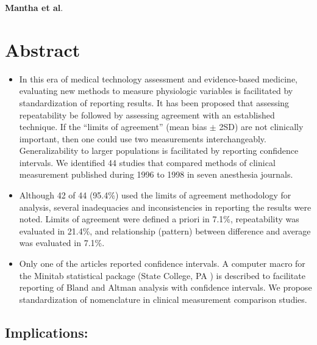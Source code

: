 \documentclass[]{article}
\title{}
\author{}
\begin{document}
{
	
\Large \textbf{Mantha et al}.

}	
	\section{Abstract}
	\begin{itemize}
		\item In this era of medical technology assessment and evidence-based medicine, evaluating new methods to measure physiologic variables is facilitated by standardization of reporting results. It has been proposed that assessing repeatability be followed by assessing agreement with an established technique. If the “limits of agreement” (mean bias $\pm$ 2SD) are not clinically important, then one could use two measurements interchangeably. Generalizability to larger populations is facilitated by reporting confidence intervals. We identified 44 studies that compared methods of clinical measurement published during 1996 to 1998 in seven anesthesia journals. 
		
		\item Although 42 of 44 (95.4\%) used the limits of agreement methodology for analysis, several inadequacies and inconsistencies in reporting the results were noted. Limits of agreement were defined a priori in 7.1\%, repeatability was evaluated in 21.4\%, and relationship (pattern) between difference and average was evaluated in 7.1\%. 
		\item Only one of the articles reported confidence intervals. A computer macro for the Minitab statistical package (State College, PA ) is described to facilitate reporting of Bland and Altman analysis with confidence intervals. We propose standardization of nomenclature in clinical measurement comparison studies.
		
	\end{itemize}
	\subsection*{Implications: }
	
\end{document}
